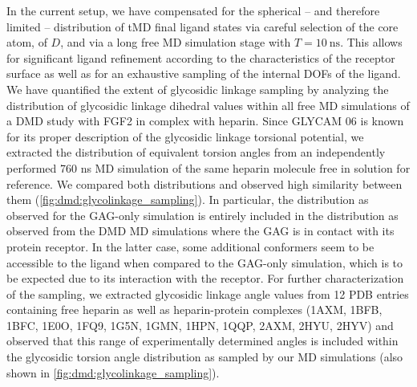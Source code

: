 In the current setup, we have compensated for the spherical – and therefore
limited – distribution of tMD final ligand states via careful selection of the
core atom, of $D$, and via a long free MD simulation stage with
$T=\SI{10}{\nano\second}$. This allows for significant ligand refinement
according to the characteristics of the receptor surface as well as for an
exhaustive sampling of the internal DOFs of the ligand. We have quantified the
extent of glycosidic linkage sampling by analyzing the distribution of
glycosidic linkage dihedral values within all free MD simulations of a DMD study
with FGF2 in complex with heparin. Since GLYCAM 06 is known for its proper
description of the glycosidic linkage torsional
potential{\cite{kirschner_glycam06:_2008}}, we extracted the distribution of
equivalent torsion angles from an independently performed 760 ns MD simulation
of the same heparin molecule free in solution for reference. We compared both
distributions and observed high similarity between them
(\cref{fig:dmd:glycolinkage_sampling}). In particular, the distribution as
observed for the GAG-only simulation is entirely included in the distribution as
observed from the DMD MD simulations where the GAG is in contact with its
protein receptor. In the latter case, some additional conformers seem to be
accessible to the ligand when compared to the GAG-only simulation, which is to
be expected due to its interaction with the receptor. For further
characterization of the sampling, we extracted glycosidic linkage angle values
from 12 PDB entries containing free heparin as well as heparin-protein complexes
(1AXM, 1BFB, 1BFC, 1E0O, 1FQ9, 1G5N, 1GMN, 1HPN, 1QQP, 2AXM, 2HYU, 2HYV) and
observed that this range of experimentally determined angles is included within
the glycosidic torsion angle distribution as sampled by our MD simulations (also
shown in \cref{fig:dmd:glycolinkage_sampling}).


